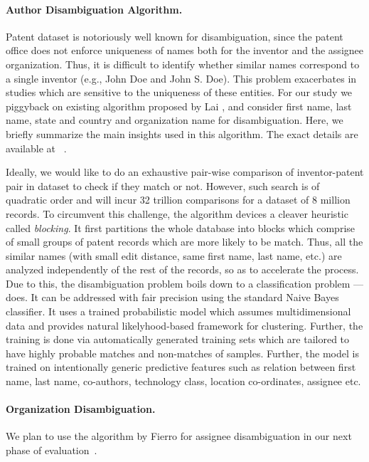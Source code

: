 \paragraph{Author Disambiguation Algorithm.}

Patent dataset is notoriously well known for disambiguation, since the patent office does not enforce uniqueness of names both for the inventor and the assignee organization. Thus, it is difficult to identify whether similar names correspond to a single inventor (e.g., John Doe and John S. Doe). This problem exacerbates in studies which are sensitive to the uniqueness of these entities.
For our study we piggyback on existing algorithm proposed by Lai \etal, and consider first name, last name, state and country and organization name for disambiguation.
Here, we briefly summarize the main insights used in this algorithm. The exact details are available at ~\cite{disambiguation}. 

Ideally, we would like to do an exhaustive pair-wise comparison of inventor-patent pair in dataset to check if they match or not. However, such search is of quadratic order and will incur 32 trillion comparisons for a dataset of 8 million records. 
To circumvent this challenge, the algorithm devices a cleaver heuristic called {\em blocking}. 
It first partitions the whole database into blocks which comprise of small groups of patent records which are more likely to be match. Thus, all the similar names (with small edit distance, same first name, last name, etc.) are 
analyzed independently of the rest of the records, so as to accelerate the process. Due to this, the disambiguation problem boils down to a classification problem --- does. It can be addressed with fair precision using the standard Naive Bayes classifier. 
It uses a trained probabilistic model which assumes multidimensional data and provides natural likelyhood-based framework for clustering. Further, the training is done via automatically generated training sets which are tailored to have highly probable matches and non-matches of samples. Further, the model is trained on intentionally generic predictive features such as relation between first name, last name, co-authors, technology class, location co-ordinates, assignee etc. 

\paragraph{Organization Disambiguation.}
We plan to use the algorithm by Fierro \etal for assignee disambiguation in our next phase of evaluation~\cite{newdisambiguation}.

